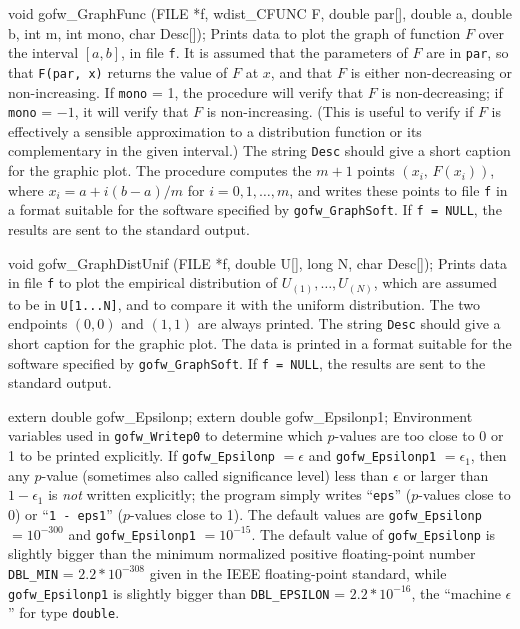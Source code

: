 void gofw_GraphFunc (FILE *f, wdist_CFUNC F, double par[], double a,
                     double b, int m, int mono, char Desc[]);
\endcode
 \tab
  Prints data to plot the graph of function $F$ over the interval $[a,b]$, 
  in file {\tt f}.  It is assumed that the parameters of $F$ are in
  {\tt par}, so that {\tt F(par, x)} returns the value of $F$ at $x$,
  and that $F$ is either non-decreasing or non-increasing.
  If {\tt mono} = 1, the procedure will verify that $F$ is non-decreasing;
  if {\tt mono} = $-1$, it will verify that $F$ is non-increasing. 
  (This is useful to verify if $F$ is effectively a sensible
  approximation to a distribution function or its complementary
  in the given interval.)
  The string {\tt Desc} should give a short caption for the graphic plot.
  The procedure computes the $m+1$ points $(x_i,\, F(x_i))$,
  where $x_i = a + i(b-a)/m$ for $i=0,1,\ldots,m$, and writes these points
  to file {\tt f} in a format suitable for the 
  software specified by {\tt gofw\_GraphSoft}.
  If {\tt f = NULL}, the results are sent to the standard output.
 \endtab
\code


void gofw_GraphDistUnif (FILE *f, double U[], long N, char Desc[]);
\endcode
 \tab  Prints data in file {\tt f} to plot the empirical distribution of
  $U_{(1)},\dots,U_{(N)}$, which are assumed to be in {\tt U[1...N]},
  and to compare it with the uniform distribution.
  The two endpoints $(0, 0)$ and $(1, 1)$ are always printed.
  The string {\tt Desc} should give a short caption for the graphic plot.
  The data is printed in a format suitable for the 
  software specified by {\tt gofw\_GraphSoft}.
  If {\tt f = NULL}, the results are sent to the standard output.
 \endtab



\code

extern double gofw_Epsilonp;
extern double gofw_Epsilonp1;
\endcode
 \tab  Environment variables used in {\tt gofw\_Writep0} to determine
   which $p$-values are too close to 0 or 1 to be printed explicitly.
   If {\tt gofw\_Epsilonp} $= \epsilon$ and
      {\tt gofw\_Epsilonp1} $= \epsilon_1$, then any $p$-value
   (sometimes also called significance level) less than $\epsilon$ or larger than
   $1-\epsilon_1$ is {\em not\/} written explicitly;
   the program simply writes ``{\tt eps}'' ($p$-values close to 0)
   or ``{\tt 1 - eps1}'' ($p$-values close to 1).
   The default values are {\tt gofw\_Epsilonp} $ =10^{-300}$ and
  {\tt gofw\_Epsilonp1} $= 10^{-15}$.
  The default value of {\tt gofw\_Epsilonp} is slightly bigger than
  the minimum normalized positive floating-point number
 {\tt DBL\_MIN} = $2.2*10^{-308}$ given in the IEEE floating-point standard, 
  while {\tt gofw\_Epsilonp1} is slightly bigger than
  {\tt DBL\_EPSILON} = $2.2*10^{-16}$, the  ``machine $\epsilon$''
  for type {\tt double}.
 \endtab
\code



